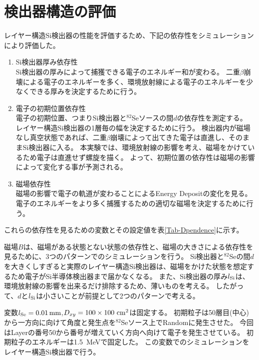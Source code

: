 \documentclass[a4paper,10pt]{jreport}
\begin{document}
\section{検出器構造の評価}

レイヤー構造Si検出器の性能を評価するため、下記の依存性をシミュレーションにより評価した。

\begin{enumerate}
	\item Si検出器厚み依存性 \\
	Si検出器の厚みによって捕獲できる電子のエネルギー和が変わる。
	二重$\beta$崩壊による電子のエネルギーを多く、環境放射線による電子のエネルギーを少なくできる厚みを決定するために行う。
	
	\item 電子の初期位置依存性 \\
	電子の初期位置、つまりSi検出器と$^{82}$Seソースの間$d$の依存性を測定する。
	レイヤー構造Si検出器の1層毎の幅を決定するために行う。
	検出器内が磁場なし真空状態であれば、二重$\beta$崩壊によって出てきた電子は直進し、そのままSi検出器に入る。
	本実験では、環境放射線の影響を考え、磁場をかけているため電子は直進せず螺旋を描く。
	よって、初期位置の依存性は磁場の影響によって変化する事が予測される。
	
	\item 磁場依存性 \\
	磁場の影響で電子の軌道が変わることによるEnergy Depositの変化を見る。
	電子のエネルギーをより多く捕獲するための適切な磁場を決定するために行う。
\end{enumerate}

これらの依存性を見るための変数とその設定値を表\ref{Tab-Dpendence}に示す。

磁場$B$は、磁場がある状態とない状態の依存性と、磁場の大きさによる依存性を見るために、3つのパターンでのシミュレーションを行う。
Si検出器と$^{82}$Seの間$d$を大きくしすぎると実際のレイヤー構造Si検出器は、磁場をかけた状態を想定するため電子がSi半導体検出器まで届かなくなる。
また、Si検出器の厚み$l_{\rm{Si}}$は、環境放射線の影響を出来るだけ排除するため、薄いものを考える。
したがって、$d$と$l_{\rm{Si}}$は小さいことが前提として2つのパターンで考える。

変数$l_{\rm{Se}} = \SI{0.01}{mm}$,$D_{xy} =100\times100\ \rm{cm}^2$は固定する。
初期粒子は50層目(中心)から一方向に向けて角度と発生点を$^{82}$Seソース上でRandomに発生させた。
今回はLayerの番号50から番号が増えていく方向へ向けて電子を発生させている。
初期粒子のエネルギーは\SI{1.5}{MeV}で固定した。
この変数でのシミュレーションをレイヤー構造Si検出器で行う。
\end{document}
